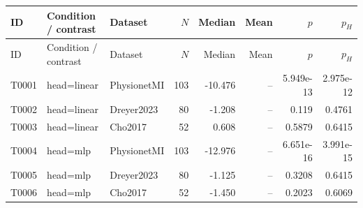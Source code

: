 \begin{longtable}{p{.45in}p{2.6in}p{.75in}rrrrr}
\toprule
ID & Condition / contrast & Dataset & $N$ & Median & Mean & $p$ & $p_H$ \\
\midrule
\endfirsthead
\toprule
ID & Condition / contrast & Dataset & $N$ & Median & Mean & $p$ & $p_H$ \\
\midrule
\endhead
T0001 & head=linear & PhysionetMI & 103 & -10.476 & -- & 5.949e-13 & 2.975e-12 \\
T0002 & head=linear & Dreyer2023 & 80 & -1.208 & -- & 0.119 & 0.4761 \\
T0003 & head=linear & Cho2017 & 52 & 0.608 & -- & 0.5879 & 0.6415 \\
T0004 & head=mlp & PhysionetMI & 103 & -12.976 & -- & 6.651e-16 & 3.991e-15 \\
T0005 & head=mlp & Dreyer2023 & 80 & -1.125 & -- & 0.3208 & 0.6415 \\
T0006 & head=mlp & Cho2017 & 52 & -1.450 & -- & 0.2023 & 0.6069 \\
\bottomrule
\end{longtable}
